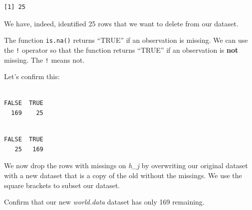 \documentclass[]{book}
\newenvironment{Shaded}{\begin{snugshade}}{\end{snugshade}}
\newcommand{\KeywordTok}[1]{\textcolor[rgb]{0.13,0.29,0.53}{\textbf{#1}}}
\newcommand{\StringTok}[1]{\textcolor[rgb]{0.31,0.60,0.02}{#1}}
\newcommand{\CommentTok}[1]{\textcolor[rgb]{0.56,0.35,0.01}{\textit{#1}}}
\newcommand{\OperatorTok}[1]{\textcolor[rgb]{0.81,0.36,0.00}{\textbf{#1}}}
\newcommand{\NormalTok}[1]{#1}
\theoremstyle{definition}
\theoremstyle{definition}
\theoremstyle{definition}
\theoremstyle{remark}
\begin{document}
\begin{verbatim}
[1] 25
\end{verbatim}

We have, indeed, identified 25 rows that we want to delete from our
dataset.

The function \texttt{is.na()} returns ``TRUE'' if an observation is
missing. We can use the \texttt{!} operator so that the function returns
``TRUE'' if an observation is \textbf{not} missing. The \texttt{!} means
not.

Let's confirm this:

\begin{Shaded}
\end{Shaded}

\begin{verbatim}

FALSE  TRUE 
  169    25 
\end{verbatim}

\begin{Shaded}
\end{Shaded}

\begin{verbatim}

FALSE  TRUE 
   25   169 
\end{verbatim}

We now drop the rows with missings on \emph{h\_j} by overwriting our
original dataset with a new dataset that is a copy of the old without
the missings. We use the square brackets to subset our dataset.

\begin{Shaded}
\end{Shaded}

Confirm that our new \emph{world.data} dataset has only 169 remaining.
\end{document}
